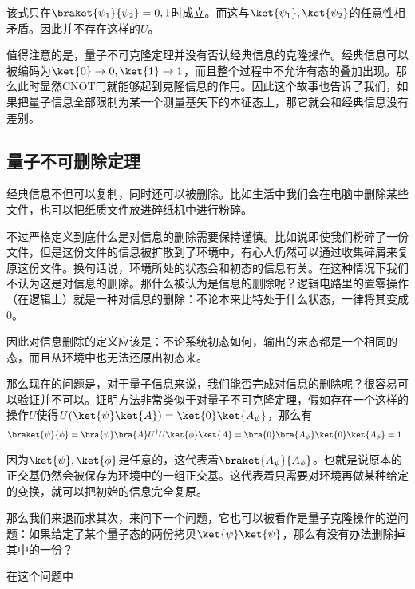 该式只在$\braket{\psi_1}{\psi_2}=0,1$时成立。而这与$\ket{\psi_1},\ket{\psi_2}$的任意性相矛盾。因此并不存在这样的$U$。

值得注意的是，量子不可克隆定理并没有否认经典信息的克隆操作。经典信息可以被编码为$\ket{0}\to0,\ket{1}\to1$，而且整个过程中不允许有态的叠加出现。那么此时显然CNOT门就能够起到克隆信息的作用。因此这个故事也告诉了我们，如果把量子信息全部限制为某一个测量基矢下的本征态上，那它就会和经典信息没有差别。

\subsection{量子不可删除定理}

经典信息不但可以复制，同时还可以被删除。比如生活中我们会在电脑中删除某些文件，也可以把纸质文件放进碎纸机中进行粉碎。

不过严格定义到底什么是对信息的删除需要保持谨慎。比如说即使我们粉碎了一份文件，但是这份文件的信息被扩散到了环境中，有心人仍然可以通过收集碎屑来复原这份文件。换句话说，环境所处的状态会和初态的信息有关。在这种情况下我们不认为这是对信息的删除。那什么被认为是信息的删除呢？逻辑电路里的置零操作（在逻辑上）就是一种对信息的删除：不论本来比特处于什么状态，一律将其变成0。

因此对信息删除的定义应该是：不论系统初态如何，输出的末态都是一个相同的态，而且从环境中也无法还原出初态来。

那么现在的问题是，对于量子信息来说，我们能否完成对信息的删除呢？很容易可以验证并不可以。证明方法非常类似于对量子不可克隆定理，假如存在一个这样的操作$U$使得$U(\ket{\psi}\ket{A})=\ket{0}\ket{A_\psi}$，那么有
\begin{equation}
\braket{\psi}{\phi}=\bra{\psi}\bra{A}U^\dagger U\ket{\phi}\ket{A}=\bra{0}\bra{A_\psi}\ket{0}\ket{A_\phi}=1~.
\end{equation}

因为$\ket{\psi},\ket{\phi}$是任意的，这代表着$\braket{A_\psi}{A_\phi}$。也就是说原本的正交基仍然会被保存为环境中的一组正交基。这代表着只需要对环境再做某种给定的变换，就可以把初始的信息完全复原。

那么我们来退而求其次，来问下一个问题，它也可以被看作是量子克隆操作的逆问题：如果给定了某个量子态的两份拷贝$\ket{\psi}\ket{\psi}$，那么有没有办法删除掉其中的一份？

在这个问题中